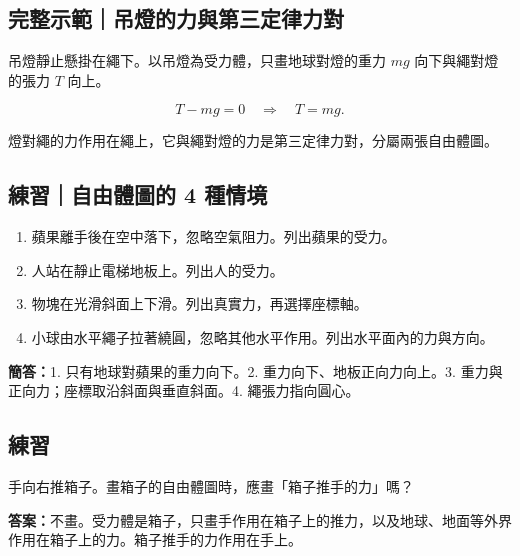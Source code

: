 \documentclass[11pt,a4paper]{article}
\providecommand{\tightlist}{%
  \setlength{\itemsep}{0pt}\setlength{\parskip}{0pt}}
\begin{document}
\begin{HandoutWorkedExample}

\subsection{完整示範｜吊燈的力與第三定律力對}\label{ux5b8cux6574ux793aux7bc4ux540aux71c8ux7684ux529bux8207ux7b2cux4e09ux5b9aux5f8bux529bux5c0d}

吊燈靜止懸掛在繩下。以吊燈為受力體，只畫地球對燈的重力 \(mg\) 向下與繩對燈的張力 \(T\) 向上。

\[
T-mg=0
\quad\Rightarrow\quad
T=mg.
\]

燈對繩的力作用在繩上，它與繩對燈的力是第三定律力對，分屬兩張自由體圖。

\end{HandoutWorkedExample}

\begin{HandoutSelfCheck}

\subsection{練習｜自由體圖的 4 種情境}\label{ux7df4ux7fd2ux81eaux7531ux9ad4ux5716ux7684-4-ux7a2eux60c5ux5883}

\begin{enumerate}
\def\labelenumi{\arabic{enumi}.}
\tightlist
\item
  蘋果離手後在空中落下，忽略空氣阻力。列出蘋果的受力。
\item
  人站在靜止電梯地板上。列出人的受力。
\item
  物塊在光滑斜面上下滑。列出真實力，再選擇座標軸。
\item
  小球由水平繩子拉著繞圓，忽略其他水平作用。列出水平面內的力與方向。
\end{enumerate}

\textbf{簡答：}1. 只有地球對蘋果的重力向下。2. 重力向下、地板正向力向上。3. 重力與正向力；座標取沿斜面與垂直斜面。4. 繩張力指向圓心。

\end{HandoutSelfCheck}

\begin{HandoutSelfCheck}

\subsection{練習}\label{ux7df4ux7fd2}

手向右推箱子。畫箱子的自由體圖時，應畫「箱子推手的力」嗎？

\textbf{答案：}不畫。受力體是箱子，只畫手作用在箱子上的推力，以及地球、地面等外界作用在箱子上的力。箱子推手的力作用在手上。

\end{HandoutSelfCheck}
\end{document}

